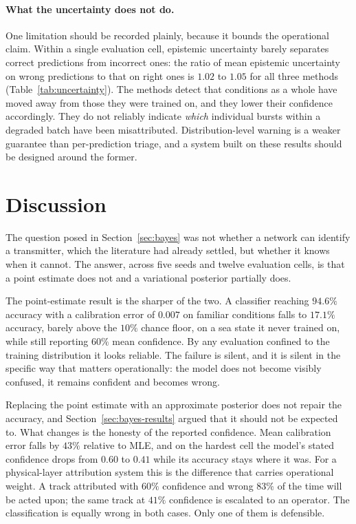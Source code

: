 \documentclass{article}
\begin{document}
\paragraph{What the uncertainty does not do.}
One limitation should be recorded plainly, because it bounds the operational
claim. Within a single evaluation cell, epistemic uncertainty barely separates
correct predictions from incorrect ones: the ratio of mean epistemic uncertainty
on wrong predictions to that on right ones is $1.02$ to $1.05$ for all three
methods (Table~\ref{tab:uncertainty}). The methods detect that conditions as a
whole have moved away from those they were trained on, and they lower their
confidence accordingly. They do not reliably indicate \emph{which} individual
bursts within a degraded batch have been misattributed. Distribution-level
warning is a weaker guarantee than per-prediction triage, and a system built on
these results should be designed around the former.

\clearpage

\section{Discussion}

The question posed in Section~\ref{sec:bayes} was not whether a network can
identify a transmitter, which the literature had already settled, but whether it
knows when it cannot. The answer, across five seeds and twelve evaluation cells,
is that a point estimate does not and a variational posterior partially does.

The point-estimate result is the sharper of the two. A classifier reaching
$94.6\%$ accuracy with a calibration error of $0.007$ on familiar conditions
falls to $17.1\%$ accuracy, barely above the $10\%$ chance floor, on a sea state
it never trained on, while still reporting $60\%$ mean confidence. By any
evaluation confined to the training distribution it looks reliable. The failure
is silent, and it is silent in the specific way that matters operationally: the
model does not become visibly confused, it remains confident and becomes wrong.

Replacing the point estimate with an approximate posterior does not repair the
accuracy, and Section~\ref{sec:bayes-results} argued that it should not be
expected to. What changes is the honesty of the reported confidence. Mean
calibration error falls by $43\%$ relative to MLE, and on the hardest cell the
model's stated confidence drops from $0.60$ to $0.41$ while its accuracy stays
where it was. For a physical-layer attribution system this is the difference
that carries operational weight. A track attributed with $60\%$ confidence and
wrong $83\%$ of the time will be acted upon; the same track at $41\%$ confidence
is escalated to an operator. The classification is equally wrong in both cases.
Only one of them is defensible.
\end{document}
